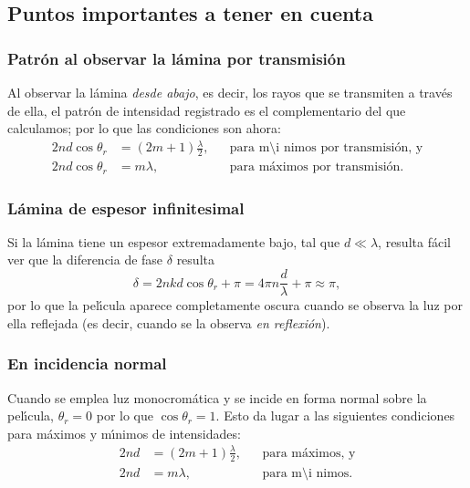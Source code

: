 \documentclass[a4paper]{article}
\begin{document}
\subsection{Puntos importantes a tener en cuenta}

\subsubsection{Patr\'on al observar la l\'amina por transmisi\'on}

Al observar la l\'amina {\it desde abajo}, es decir, los rayos que se 
transmiten a trav\'es de ella, el patr\'on de intensidad registrado es el
complementario del que calculamos; por lo que las condiciones son ahora:
\begin{align}
    2 n d \cos \theta_r &= (2 m + 1) \frac{\lambda}{2}, 
    &&\text{para m\'\i nimos por transmisi\'on, y} \\
    2 n d \cos \theta_r &= m \lambda, 
    &&\text{para m\'aximos por transmisi\'on.}
\end{align}


\subsubsection{L\'amina de espesor infinitesimal}

Si la l\'amina tiene un espesor extremadamente bajo, tal que $d \ll \lambda$,
resulta f\'acil ver que la diferencia de fase $\delta$ resulta
\begin{equation}
    \delta = 2 n k d \cos \theta_r + \pi = 4 \pi n \frac{d}{\lambda} + \pi 
    \approx  \pi,
\end{equation}
por lo que la pel\'\i cula aparece completamente oscura cuando se observa 
la luz por ella reflejada (es decir, cuando se la observa 
{\it en reflexi\'on}). 

\subsubsection{En incidencia normal}

Cuando se emplea luz monocrom\'atica y se incide en forma normal sobre la
pel\'\i cula, $\theta_r = 0$ por lo que $\cos \theta_r = 1$. Esto da lugar
a las siguientes condiciones para m\'aximos y m\'\i nimos de intensidades:
\begin{align}
    2 n d &= (2 m + 1) \frac{\lambda}{2}, &&\text{para m\'aximos, y} \\
    2 n d &= m \lambda, &&\text{para m\'\i nimos.}
\end{align}
\end{document}
